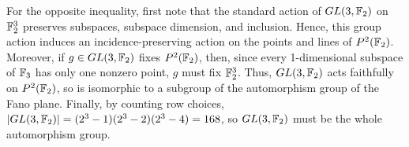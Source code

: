 \documentclass{article}
\begin{document}
For the opposite inequality, first note that the standard action of $GL(3, \mathbb{F}_2)$ on $\mathbb{F}_2^3$ preserves subspaces, subspace dimension, and inclusion. Hence, this group action induces an incidence-preserving action on the points and lines of $P^2(\mathbb{F}_2)$.  Moreover, if $g \in GL(3, \mathbb{F}_2)$ fixes $P^2(\mathbb{F}_2)$, then, since every 1-dimensional subspace of $\mathbb{F}_3$ has only one nonzero point, $g$ must fix $\mathbb{F}_2^3$. Thus, $GL(3, \mathbb{F}_2)$ acts faithfully on $P^2(\mathbb{F}_2)$, so is isomorphic to a subgroup of the automorphism group of the Fano plane.   Finally, by counting row choices, $|GL(3, \mathbb{F}_2)| = (2^3 - 1)(2^3 - 2)(2^3 - 4) = 168$, so $GL(3, \mathbb{F}_2)$ must be the whole automorphism group.



\end{document}
